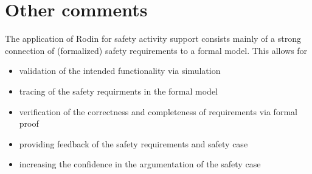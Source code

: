 \section{Other comments}

\begin{author_comment}
  The application of Rodin for safety activity support consists mainly of a
  strong connection of (formalized) safety requirements to a formal model. This
  allows for
  \begin{itemize}
  \item validation of  the intended functionality via simulation
  \item tracing of the safety requirments in the formal model
  \item verification of the  correctness and  completeness of requirements via
    formal proof
  \item providing feedback of the safety requirements and safety case
  \item increasing  the confidence in the argumentation of the safety case
  \end{itemize}
\end{author_comment}


